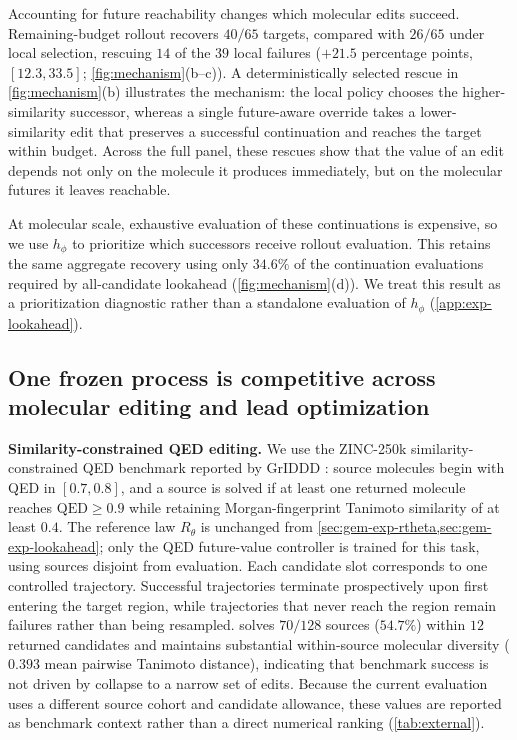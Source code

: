 Accounting for future reachability changes which molecular edits succeed. Remaining-budget rollout recovers $40/65$ targets, compared with $26/65$ under local selection, rescuing $14$ of the $39$ local failures ($+21.5$ percentage points, $[12.3,33.5]$; \cref{fig:mechanism}(b--c)). A deterministically selected rescue in \cref{fig:mechanism}(b) illustrates the mechanism: the local policy chooses the higher-similarity successor, whereas a single future-aware override takes a lower-similarity edit that preserves a successful continuation and reaches the target within budget. Across the full panel, these rescues show that the value of an edit depends not only on the molecule it produces immediately, but on the molecular futures it leaves reachable.

At molecular scale, exhaustive evaluation of these continuations is expensive, so we use $h_\phi$ to prioritize which successors receive rollout evaluation. This retains the same aggregate recovery using only $34.6\%$ of the continuation evaluations required by all-candidate lookahead (\cref{fig:mechanism}(d)). We treat this result as a prioritization diagnostic rather than a standalone evaluation of $h_\phi$ (\cref{app:exp-lookahead}).

\subsection{One frozen process is competitive across molecular editing and lead optimization}
\label{sec:gem-exp-external}

\textbf{Similarity-constrained QED editing.} We use the ZINC-250k similarity-constrained QED benchmark reported by GrIDDD \citep{ninniri2025griddd}: source molecules begin with QED in $[0.7,0.8]$, and a source is solved if at least one returned molecule reaches $\mathrm{QED}\ge0.9$ while retaining Morgan-fingerprint Tanimoto similarity of at least $0.4$. The reference law $R_\theta$ is unchanged from \cref{sec:gem-exp-rtheta,sec:gem-exp-lookahead}; only the QED future-value controller is trained for this task, using sources disjoint from evaluation. Each candidate slot corresponds to one controlled trajectory. Successful trajectories terminate prospectively upon first entering the target region, while trajectories that never reach the region remain failures rather than being resampled. \method{} solves $70/128$ sources ($54.7\%$) within $12$ returned candidates and maintains substantial within-source molecular diversity ($0.393$ mean pairwise Tanimoto distance), indicating that benchmark success is not driven by collapse to a narrow set of edits. Because the current \method{} evaluation uses a different source cohort and candidate allowance, these values are reported as benchmark context rather than a direct numerical ranking (\cref{tab:external}).

